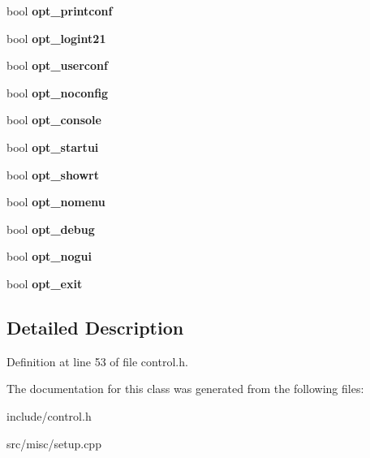\begin{DoxyCompactItemize}
\item 
\hypertarget{classConfig_a24565a6dde3cdee29932e4111159159f}{bool {\bfseries opt\-\_\-printconf}}\label{classConfig_a24565a6dde3cdee29932e4111159159f}

\item 
\hypertarget{classConfig_a26b0c59bff2dee49c14acf353e0b328f}{bool {\bfseries opt\-\_\-logint21}}\label{classConfig_a26b0c59bff2dee49c14acf353e0b328f}

\item 
\hypertarget{classConfig_abc1d20b4e95a43c9665325d3223a6cca}{bool {\bfseries opt\-\_\-userconf}}\label{classConfig_abc1d20b4e95a43c9665325d3223a6cca}

\item 
\hypertarget{classConfig_a19077a3158fb71c22a122d8a398e81c7}{bool {\bfseries opt\-\_\-noconfig}}\label{classConfig_a19077a3158fb71c22a122d8a398e81c7}

\item 
\hypertarget{classConfig_ac60d20f3d6db383b0278989e78499371}{bool {\bfseries opt\-\_\-console}}\label{classConfig_ac60d20f3d6db383b0278989e78499371}

\item 
\hypertarget{classConfig_a60d72de7a98e1d1142a21103f3165196}{bool {\bfseries opt\-\_\-startui}}\label{classConfig_a60d72de7a98e1d1142a21103f3165196}

\item 
\hypertarget{classConfig_a0b78abf9471b6a2d04d228be7e6792f2}{bool {\bfseries opt\-\_\-showrt}}\label{classConfig_a0b78abf9471b6a2d04d228be7e6792f2}

\item 
\hypertarget{classConfig_ace74f2fb3b918cc45b2486a59281cafc}{bool {\bfseries opt\-\_\-nomenu}}\label{classConfig_ace74f2fb3b918cc45b2486a59281cafc}

\item 
\hypertarget{classConfig_a7d68ad804907496b417a951ed1eada22}{bool {\bfseries opt\-\_\-debug}}\label{classConfig_a7d68ad804907496b417a951ed1eada22}

\item 
\hypertarget{classConfig_ae904e5c4af1cac4af77feb7af250ad29}{bool {\bfseries opt\-\_\-nogui}}\label{classConfig_ae904e5c4af1cac4af77feb7af250ad29}

\item 
\hypertarget{classConfig_a9f68df279656da4abd730ffa83fbb38a}{bool {\bfseries opt\-\_\-exit}}\label{classConfig_a9f68df279656da4abd730ffa83fbb38a}

\end{DoxyCompactItemize}


\subsection{Detailed Description}


Definition at line 53 of file control.\-h.



The documentation for this class was generated from the following files\-:\begin{DoxyCompactItemize}
\item 
include/control.\-h\item 
src/misc/setup.\-cpp\end{DoxyCompactItemize}
